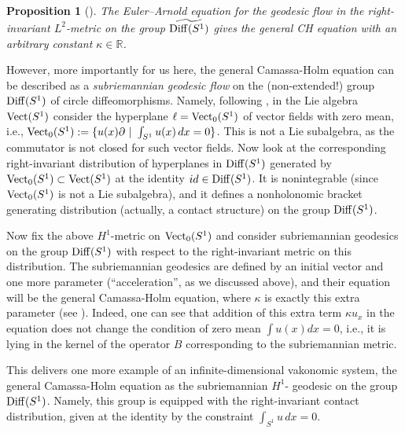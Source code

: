 \documentclass[11pt]{article}
\newtheorem{proposition}[lemma]{Proposition}
\theoremstyle{definition}
\newcounter{ai}
\begin{document}
\begin{proposition}[\cite{misiolek1998, grong2015sub, khesin2024information}]
The Euler--Arnold equation for the geodesic flow in the right-invariant $L^2$-metric on the group 
$\widetilde{ {\rm Diff}(S^1)}$  gives the general CH equation with an arbitrary constant $\kappa\in \mathbb R$.    
\end{proposition}


\medskip

However, more importantly for us here,  the general Camassa-Holm equation can be described as a {\it subriemannian geodesic flow} on the (non-extended!)
group ${\rm Diff}(S^1)$ of circle diffeomorphisms. Namely, following \cite{grong2015sub},
 in the Lie algebra ${\rm Vect}(S^1)$ consider the hyperplane $\ell={\rm Vect}_0(S^1)$ of vector fields with zero mean, i.e., ${\rm Vect}_0(S^1):=\{u(x)\partial~|~\int_{S^1}u(x)\,dx=0\}$. This is not a Lie subalgebra, as the commutator is not closed for such vector fields. 
 Now look at the corresponding right-invariant distribution of hyperplanes 
in  ${\rm Diff}(S^1)$ generated by ${\rm Vect}_0(S^1)\subset {\rm Vect}(S^1)$
at the identity $id\in {\rm Diff}(S^1)$. 
It is nonintegrable  (since ${\rm Vect}_0(S^1)$ is not a Lie subalgebra), and it defines a nonholonomic bracket generating distribution (actually, a  contact structure) on the group ${\rm Diff}(S^1)$. 

Now fix the above $H^1$-metric  on ${\rm Vect}_0(S^1)$ and consider subriemannian geodesics on the group  
${\rm Diff}(S^1)$ with respect to the right-invariant metric on this distribution. The subriemannian geodesics are defined by an initial vector and one more parameter (``acceleration'', as we discussed above), and their equation will be the general Camassa-Holm equation, where $\kappa$ is exactly this extra parameter (see \cite{grong2015sub}). Indeed, one can see that addition of this extra term $\kappa u_x$ in the equation does
not change the condition of zero mean $\int u(x)dx=0$, i.e., it is lying in the kernel of the operator $B$ corresponding to the subriemannian metric.


This delivers one more example of  an infinite-dimensional vakonomic system,  the general Camassa-Holm equation as the subriemannian $H^1$- geodesic on the group ${\rm Diff}(S^1)$. Namely, this group is equipped with the right-invariant contact distribution, given at the identity by the constraint $\int_{S^1}u\,dx=0$. 
\medskip


\end{document}
